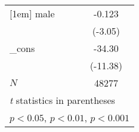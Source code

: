 {\begin{tabular}{l*{1}{c}}
[1em]
male        &      -0.123\sym{**} \\
            &     (-3.05)         \\
[1em]
\_cons      &      -34.30\sym{***}\\
            &    (-11.38)         \\
\hline
\(N\)       &       48277         \\
\hline\hline
\multicolumn{2}{l}{\footnotesize \textit{t} statistics in parentheses}\\
\multicolumn{2}{l}{\footnotesize \sym{*} \(p<0.05\), \sym{**} \(p<0.01\), \sym{***} \(p<0.001\)}\\
\end{tabular}
}
